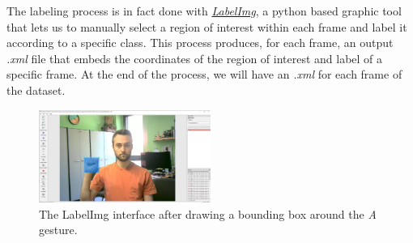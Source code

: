 \documentclass[a4paper, 12pt]{article}
\begin{document}
The labeling process is in fact done with \textit{\hyperref[Ref11]{LabelImg}}, a python based graphic tool that lets us to manually select a region of interest within each frame and label it according to a specific class.
This process produces, for each frame, an output \textit{.xml} file that embeds the coordinates of the region of interest and label of a specific frame. At the end of the process, we will have an \textit{.xml} for each frame of the dataset.

\begin{figure}[!h]
    \centering
    \includegraphics[width=0.5\textwidth]{resources/image/labelImgScreenshot.PNG} \caption{The LabelImg interface after drawing a bounding box around the \textit{A} gesture.}
\end{figure}
\end{document}
